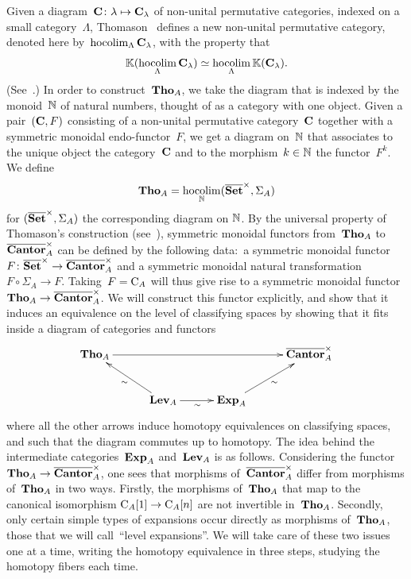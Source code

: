 
Given a diagram~$\mathbf{C}\colon\lambda\mapsto\mathbf{C}_\lambda$ of non-unital permutative categories, indexed
on a small category~$\Lambda$, Thomason~\cite[Const.~3.22]{Thomason} defines a new non-unital  permutative category, denoted here by~$\operatorname*{hocolim}_{\Lambda}\mathbf{C}_\lambda$, with the property that
\begin{equation}\label{eq:thmTho}
\mathbb{K}(\operatorname*{hocolim}_{\Lambda}\mathbf{C}_\lambda)
\simeq
\operatorname*{hocolim}_{\Lambda}\mathbb{K}(\mathbf{C}_\lambda).
\end{equation}
(See~\cite[Thm.~4.1]{Thomason}.) 
In order to construct~$\mathbf{Tho}_A$, we take the diagram that is indexed by the monoid~$\mathbb{N}$ of natural numbers, thought of as a category with one object. Given a pair~$(\mathbf{C},F)$ consisting of a non-unital permutative category~$\mathbf{C}$ together with a symmetric monoidal endo-functor~$F$, we get a diagram on~$\mathbb{N}$ that associates to the unique object the category~$\mathbf{C}$ and to the morphism~$k\in \mathbb{N}$ the functor~$F^k$. We  define
\begin{equation}\label{eq:defTho}
\mathbf{Tho}_A=\operatorname*{hocolim}_{\mathbb{N}}(\overline{\mathbf{Set}}^\times,\Sigma_A)
\end{equation}
for $(\overline{\mathbf{Set}}^\times,\Sigma_A)$ the corresponding diagram on $\mathbb{N}$. 
By the universal property of Thomason's construction (see~\cite[Prop 3.21]{Thomason}), %
symmetric monoidal functors from~$\mathbf{Tho}_A$ to~$\overline{\mathbf{Cantor}}_A^\times$ can be defined by the following data:~a symmetric monoidal functor~$F\colon\overline{\mathbf{Set}}^\times\to\overline{\mathbf{Cantor}}_A^\times$ and a symmetric monoidal natural transformation~\hbox{$F\circ\Sigma_A\to F$}. Taking~$F=\mathrm{C}_A$ will thus give rise to a symmetric monoidal functor~\hbox{$\mathbf{Tho}_A\to\overline{\mathbf{Cantor}}_A^\times$}. We will construct this functor explicitly, and show that it induces an equivalence on the level of classifying spaces by showing that it fits inside a diagram
of categories and functors 
\[
\xymatrix@C=30pt{\Tho_A \ar[rrr] & & &  \bCan_A^\times\\
& \Lev_A \ar[ul]^\sim\ar[r]_\sim & \ar[ur]_\sim \Exp_A &}
\]
where all the other arrows induce homotopy equivalences on classifying spaces, and such that the diagram  commutes up to homotopy. 
The idea behind the intermediate categories~$\mathbf{Exp}_A$ and~$\mathbf{Lev}_A$ is as follows. Considering the functor~$\mathbf{Tho}_A\to\overline{\mathbf{Cantor}}_A^\times$, one sees that morphisms of~$\overline{\mathbf{Cantor}}_A^\times$ differ from morphisms of~$\mathbf{Tho}_A$ in two ways. Firstly, the morphisms of~$\mathbf{Tho}_A$ that map to the canonical isomorphism $\mathrm{C}_A[1]\to \mathrm{C}_A[n]$ are not invertible in~$\mathbf{Tho}_A$. Secondly, only certain simple types of expansions occur directly as morphisms of~$\mathbf{Tho}_A$, those that we will call~``level expansions''. We will take care of these two issues one at a time, writing the homotopy equivalence in three steps, studying the homotopy fibers each time. 


